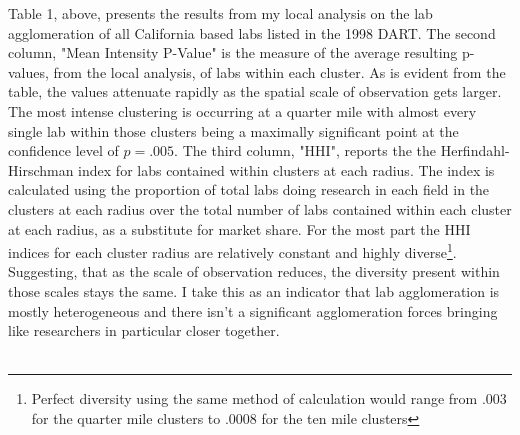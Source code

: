 \documentclass[12pt,letterpaper]{article}
\begin{document}
Table 1, above,  presents the results from my local analysis on the lab agglomeration of all California based labs listed in the 1998 DART. The second column, "Mean Intensity P-Value" is the measure of the average resulting p-values, from the local analysis, of labs within each cluster. As is evident from the table, the values attenuate rapidly as the spatial scale of observation gets larger. The most intense clustering is occurring at a quarter mile with almost every single lab within those clusters being a maximally significant point at the confidence level of \(p=.005\). The third column, "HHI", reports the the Herfindahl-Hirschman index for labs contained within clusters at each radius. The index is calculated using the proportion of total labs doing research in each field in the clusters at each radius over the total number of labs contained within each cluster at each radius, as a substitute for market share. For the most part the HHI indices for each cluster radius are relatively constant and highly diverse\footnote{Perfect diversity using the same method of calculation would range from .003 for the quarter mile clusters to .0008 for the ten mile clusters}. Suggesting, that as the scale of observation reduces, the diversity present within those scales stays the same. I take this as an indicator that lab agglomeration is mostly heterogeneous and there isn't a significant agglomeration forces bringing like researchers in particular closer together. 
\\
\\
\end{document}
